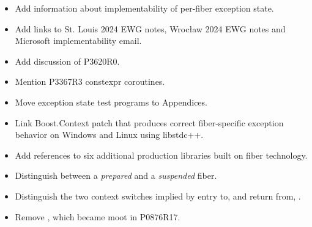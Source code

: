 
\begin{itemize}
    \item Add information about implementability of per-fiber exception state.
    \item Add links to St. Louis 2024 EWG notes, Wrocław 2024 EWG notes and
          Microsoft implementability email.
    \item Add discussion of P3620R0.
    \item Mention P3367R3 constexpr coroutines.
\end{itemize}


\begin{itemize}
    \item Move exception state test programs to Appendices.
    \item Link Boost.Context patch that produces correct fiber-specific
          exception behavior on Windows and Linux using libstdc++.
    \item Add references to six additional production libraries built on fiber
          technology.
\end{itemize}


\begin{itemize}
    \item Distinguish between a \emph{prepared} and a \emph{suspended} fiber.
    \item Distinguish the two context switches implied by entry to, and return
          from, \resumewith.
    \item Remove , which became moot
          in P0876R17.
\end{itemize}


